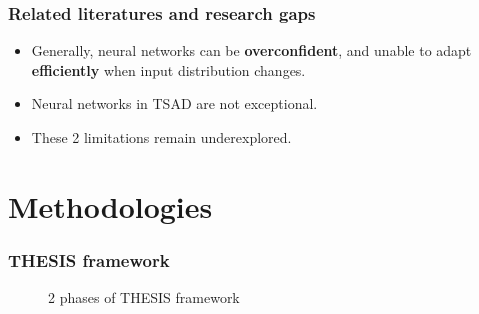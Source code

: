 \documentclass[aspectratio=169]{beamer}
\begin{document}



\begin{frame}
  \frametitle{Related literatures and research gaps}
  \begin{itemize}
  \item Generally, neural networks can be \textbf{overconfident}, and unable to adapt \textbf{efficiently} when input distribution changes.
  \item Neural networks in TSAD are not exceptional.
  \item These 2 limitations remain underexplored.
  \end{itemize}
\end{frame}

\section{Methodologies}

\begin{frame}
    \frametitle{THESIS framework}
    \begin{figure}[H]
    \centering
    
    \caption[2 phases of THESIS framework] {2 phases of THESIS framework}
    \label{fig:thesis-framework}
    \end{figure}
\end{frame}
\end{document}
